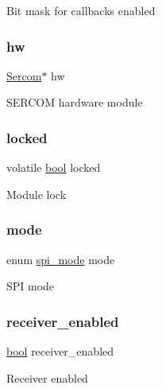 Bit mask for callbacks enabled \mbox{\label{structspi__module_a0c1e47f7408dce5f667a53398c82d13a}} 
\subsubsection{\texorpdfstring{hw}{hw}}
{\footnotesize\ttfamily \mbox{\hyperlink{union_sercom}{Sercom}}$\ast$ hw}

S\+E\+R\+C\+OM hardware module \mbox{\label{structspi__module_a765892434f9329ded45a5287eeb75957}} 
\subsubsection{\texorpdfstring{locked}{locked}}
{\footnotesize\ttfamily volatile \mbox{\hyperlink{group__group__sam0__utils_ga97a80ca1602ebf2303258971a2c938e2}{bool}} locked}

Module lock \mbox{\label{structspi__module_aa56044693231ac71d809d1c28e94800a}} 
\subsubsection{\texorpdfstring{mode}{mode}}
{\footnotesize\ttfamily enum \mbox{\hyperlink{group__asfdoc__sam0__sercom__spi__group_ga78c1313670220bedfecdb138d4c27903}{spi\+\_\+mode}} mode}

S\+PI mode \mbox{\label{structspi__module_aa555f88ee76a65a51c526b3e912b711d}} 
\subsubsection{\texorpdfstring{receiver\_enabled}{receiver\_enabled}}
{\footnotesize\ttfamily \mbox{\hyperlink{group__group__sam0__utils_ga97a80ca1602ebf2303258971a2c938e2}{bool}} receiver\+\_\+enabled}

Receiver enabled \mbox{\label{structspi__module_a635e5d3373f317370711cc10ec77e0f9}} 
